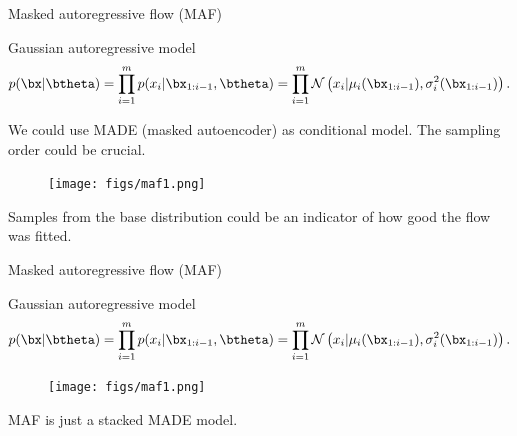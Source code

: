 \begin{frame}{Masked autoregressive flow (MAF)}
	\begin{block}{Gaussian autoregressive model}
		\vspace{-0.5cm}
		\[
		p(\bx | \btheta) = \prod_{i=1}^m p(x_i | \bx_{1:i - 1}, \btheta) = \prod_{i=1}^m \mathcal{N} \left(x_i | \mu_i(\bx_{1:i-1}), \sigma^2_i (\bx_{1:i-1})\right).
		\]
		\vspace{-0.5cm}
	\end{block}
	We could use MADE (masked autoencoder) as conditional model. The sampling order could be crucial.
	\begin{figure}
		\texttt{[image: figs/maf1.png]}
	\end{figure}
	Samples from the base distribution could be an indicator of how good the flow was fitted. \\
\end{frame}
\begin{frame}{Masked autoregressive flow (MAF)}
	\begin{block}{Gaussian autoregressive model}
		\vspace{-0.5cm}
		\[
		p(\bx | \btheta) = \prod_{i=1}^m p(x_i | \bx_{1:i - 1}, \btheta) = \prod_{i=1}^m \mathcal{N} \left(x_i | \mu_i(\bx_{1:i-1}), \sigma^2_i (\bx_{1:i-1})\right).
		\]
		\vspace{-0.5cm}
	\end{block}
	\begin{figure}
		\texttt{[image: figs/maf1.png]}
	\end{figure}
	MAF is just a stacked MADE model.
\end{frame}
